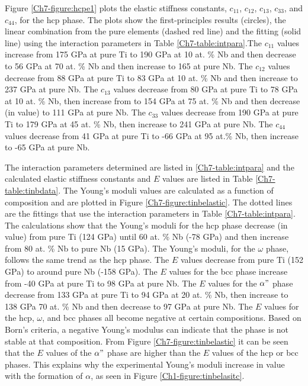 Figure \ref{Ch7-figure:hcpe1} plots the elastic stiffness constants, $c_{11}$, $c_{12}$, $c_{13}$, $c_{33}$, and $c_{44}$, for the hcp phase. The plots show the first-principles results (circles), the linear combination from the pure elements (dashed red line) and the fitting (solid line) using the interaction parameters in Table \ref{Ch7-table:intpara}.The $c_{11}$ values increase from 175 GPa at pure Ti to 190 GPa at 10 at. \% Nb and then decrease to 56 GPa at 70 at. \% Nb and then increase to 165 at pure Nb. The $c_{12}$ values decrease from 88 GPa at pure Ti to 83 GPa at 10 at. \% Nb and then increase to 237 GPa at pure Nb. The $c_{13}$ values decrease from 80 GPa at pure Ti to 78 GPa at 10 at. \% Nb, then increase from to 154 GPa at 75 at. \% Nb and then decrease (in value) to 111 GPa at pure Nb. The $c_{33}$ values decrease from 190 GPa at pure Ti to 179 GPa at 45 at. \% Nb, then increase to 241 GPa at pure Nb. The $c_{44}$ values decrease from 41 GPa at pure Ti to -66 GPa at 95 at.\% Nb, then increase to -65 GPa at pure Nb.

The interaction parameters determined are listed in \ref{Ch7-table:intpara} and the calculated elastic stiffness constants and $E$ values are listed in Table \ref{Ch7-table:tinbdata}. The Young's moduli values are calculated as a function of composition and are plotted in Figure \ref{Ch7-figure:tinbelastic}. The dotted lines are the fittings that use the interaction parameters in Table \ref{Ch7-table:intpara}. The calculations show that the Young's moduli for the hcp phase decrease (in value) from pure Ti (124 GPa) until 60 at. \% Nb (-78 GPa) and then increase from 80 at. \% Nb to pure Nb (15 GPa). The Young's moduli, for the $\omega$ phase, follows the same trend as the hcp phase. The $E$ values decrease from pure Ti (152 GPa) to around pure Nb (-158 GPa). The $E$ values for the bcc phase increase from -40 GPa at pure Ti to 98 GPa at pure Nb. The $E$ values for the $\alpha"$ phase decrease from 133 GPa at pure Ti to 94 GPa at 20 at. \% Nb, then increase to 138 GPa 70 at. \% Nb and then decrease to 97 GPa at pure Nb. The $E$ values for the hcp, $\omega$, and bcc phases all become negative at certain compositions. Based on Born's criteria, a negative Young's modulus can indicate that the phase is not stable at that composition. From Figure \ref{Ch7-figure:tinbelastic} it can be seen that the $E$ values of the $\alpha"$ phase are higher than the $E$ values of the hcp or bcc phases. This explains why the experimental Young's moduli increase in value with the formation of $\alpha$, as seen in Figure \ref{Ch1-figure:tinbelasitc}. 

